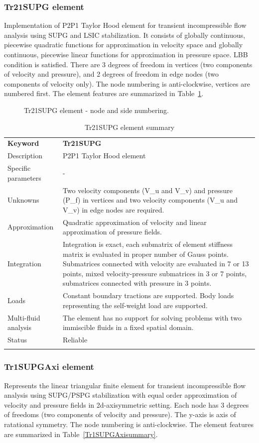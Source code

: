 \documentclass[a4paper]{article}
\newcommand{\templabel}{}%
\newcommand{\tempcaption}{}%
\newcounter{nelpar}
\newenvironment{elementsummary}[5]{%
  \gdef\tempcaption{#4}%
  \gdef\templabel{#5}%
  \setcounter{nelpar}{0}%
  \begin{center} %
    \begin{table}[!htb] %
      \begin{tabular}{|l|p{9cm}|}\hline %
        {\bf Keyword} & \bf{#1}\\ %
        {Description} & {#2}\\ %
        {Specific parameters} & {#3}\\ \hline %
}{
  \\ \hline %
      \end{tabular}%
      \caption{\tempcaption}%
      \label{\templabel}%
    \end{table}%
  \end{center}%
}
\newcommand{\elementDescription}[2]{{#1} & {#2}\\}
\begin{document}
\subsubsection{Tr21SUPG element}
\label{Tr21SUPG}
Implementation of P2P1 Taylor Hood element for transient incompressible flow analysis 
using SUPG and LSIC stabilization. It consists of globally continuous, piecewise quadratic functions for 
approximation in velocity space and globally continuous, piecewise linear functions for
approximation in pressure space. LBB condition is satisfied. There are 3 degrees
of freedom in vertices (two components of velocity and pressure), and 2 degrees of freedom
in edge nodes (two components of velocity only).
The node numbering is anti-clockwise, vertices are numbered first. The element features are summarized in Table~\ref{Tr21SUPGsummary}.

\begin{figure}[htb]
 \centering
 \begin{makeimage}
  
 \end{makeimage}
 \caption{Tr21SUPG element - node and side numbering.}
 \label{Tr21SUPGfig}
\end{figure}

\begin{elementsummary}{Tr21SUPG}{P2P1 Taylor Hood element}{-}{Tr21SUPG element summary}{Tr21SUPGsummary}
\elementDescription{Unknowns}{Two velocity components (V\_u and V\_v) and pressure (P\_f) in vertices and two velocity components (V\_u and V\_v) in edge nodes are required.}
\elementDescription{Approximation}{Quadratic approximation of velocity and linear approximation of pressure fields.}
\elementDescription{Integration}{Integration is exact, each submatrix of element stiffness matrix is evaluated in proper number of
Gauss points. Submatrices connected with velocity are evaluated in 7 or 13 points, mixed velocity-pressure
submatrices in 3 or 7 points, submatrices connected with pressure in 3 points.}
\elementDescription{Loads}{Constant boundary tractions are supported. Body loads
representing the self-weight load are supported.}
\elementDescription{Multi-fluid analysis}{The element has no support for solving
problems with two immiscible fluids in a fixed spatial domain.}
\elementDescription{Status}{Reliable}
\end{elementsummary}


\subsubsection{Tr1SUPGAxi element}
\label{Tr1SUPGAxi}
Represents the linear triangular finite element for transient
incompressible flow analysis using SUPG/PSPG stabilization with equal order
approximation of velocity and pressure fields in 2d-axisymmetric setting. Each node has 3 degrees
of freedoms (two components of velocity and pressure). The y-axis is
axis of ratational symmetry. The node numbering is anti-clockwise. The element features are summarized in Table~\ref{Tr1SUPGAxisummary}.
\end{document}
